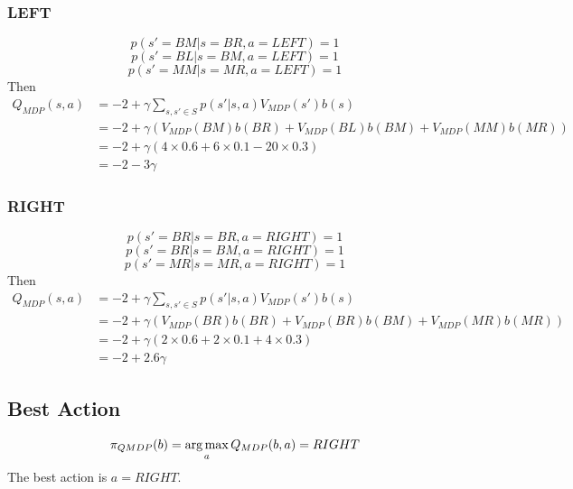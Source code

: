 \subsubsection{LEFT}
\[p(s'=BM|s=BR,a=LEFT)=1\]
\[p(s'=BL|s=BM,a=LEFT)=1\]
\[p(s'=MM|s=MR,a=LEFT)=1\]
Then
\begin{equation}
\begin{aligned}
    Q_{MDP}(s,a) 
    &=-2 + \gamma \sum_{s,s'\in S} p(s'|s,a)V_{MDP}(s')b(s)\\
    &= -2 + \gamma(V_{MDP}(BM)b(BR)+V_{MDP}(BL)b(BM)+V_{MDP}(MM)b(MR))\\
    &= -2 + \gamma(4\times 0.6 +6\times 0.1-20\times 0.3)\\
    &= -2 - 3\gamma
\end{aligned}
\end{equation}

\subsubsection{RIGHT}
\[p(s'=BR|s=BR,a=RIGHT)=1\]
\[p(s'=BR|s=BM,a=RIGHT)=1\]
\[p(s'=MR|s=MR,a=RIGHT)=1\]
Then
\begin{equation}
\begin{aligned}
    Q_{MDP}(s,a) 
    &=-2 + \gamma \sum_{s,s'\in S} p(s'|s,a)V_{MDP}(s')b(s)\\
    &= -2 + \gamma(V_{MDP}(BR)b(BR)+V_{MDP}(BR)b(BM)+V_{MDP}(MR)b(MR))\\
    &= -2 + \gamma(2\times 0.6 +2\times 0.1+4\times 0.3)\\
    &= -2 + 2.6\gamma
\end{aligned}
\end{equation}

\subsection{Best Action}
\[\pi_{QMDP}(b)=\operatorname*{arg\,max}_a Q_{MDP}(b,a)=RIGHT\]
The best action is $a=RIGHT$.

\newpage




